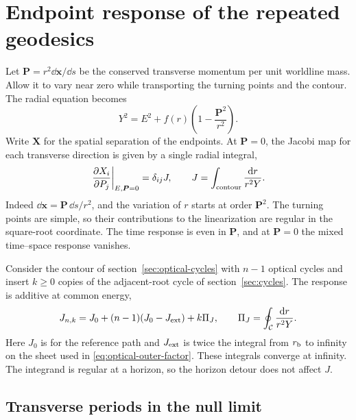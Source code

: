 \section{Endpoint response of the repeated geodesics}
\label{sec:geodesic-jacobi}

Let \(\boldsymbol P=r^2\dd\boldsymbol{x}/\dd s\) be the conserved
transverse momentum per unit worldline mass. Allow it to vary near
zero while transporting the turning points and the contour. The
radial equation becomes
\begin{equation}
 Y^2=E^2+f(r)\left(1-\frac{\boldsymbol P^2}{r^2}\right).
 \label{eq:geodesic-transverse}
\end{equation}
Write \(\boldsymbol X\) for the spatial separation of the
endpoints. At \(\boldsymbol P=0\), the Jacobi map for each transverse
direction is given by a single radial integral,
\begin{equation}
 \left.\frac{\partial X_i}{\partial P_j}\right|_{E,\boldsymbol P=0}
   =\delta_{ij}J,\qquad
 J=\int_{\rm contour}\frac{\mathrm{d} r}{r^2Y}.
 \label{eq:geodesic-jacobi-integral}
\end{equation}
Indeed \(\dd\boldsymbol{x}=\boldsymbol P\,\dd s/r^2\), and the
variation of \(r\) starts at order \(\boldsymbol P^2\). The
turning points are simple, so their contributions to the
linearization are regular in the square-root coordinate.
The time response is even in \(\boldsymbol P\), and at
\(\boldsymbol P=0\) the mixed time--space response vanishes.

Consider the contour of section~\ref{sec:optical-cycles} with \(n-1\)
optical cycles and insert \(k\geq0\) copies of the adjacent-root
cycle of section~\ref{sec:cycles}. The response is additive at
common energy,
\begin{equation}
 J_{n,k}=J_0+(n-1)(J_0-J_{\rm ext})+k\Pi_J,\qquad
 \Pi_J=\oint_{\mathcal C}\frac{\mathrm{d} r}{r^2Y}.
 \label{eq:jacobi-additivity}
\end{equation}
Here \(J_0\) is for the reference path and \(J_{\rm ext}\) is twice
the integral from \(r_{\rm b}\) to infinity on the sheet used in
\eqref{eq:optical-outer-factor}. These integrals converge at
infinity. The integrand is regular at a horizon, so the horizon
detour does not affect \(J\).

\subsection{Transverse periods in the null limit}


